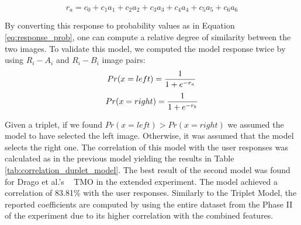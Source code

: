 \begin{equation}
\label{eq:log_regression}
    r_a = c_0 + c_1a_1 + c_2a_2 + c_3a_3 + c_4a_4 + c_5a_5 + c_6a_6 
\end{equation}

By converting this response to probability values as in Equation \ref{eq:response_prob}, one can compute a relative degree of similarity between the two images. To validate this model, we computed the model response twice by using $R_i - A_i$ and $R_i - B_i$ image pairs:
\begin{equation}
    Pr(x = left) = {{1} \over {1 + e^{-r_a}}} 
\end{equation}
\begin{equation}
    Pr(x = right) = {{1} \over {1 + e^{-r_b}}}
\end{equation}


Given a triplet, if we found $Pr(x = left) > Pr(x =right)$ we assumed the model to have selected the left image. Otherwise, it was assumed that the model selects the right one. The correlation of this model with the user responses was calculated as in the previous model yielding the results in Table \ref{tab:correlation_duplet_model}. The best result of the second model was found for Drago et al.’s ~\cite{drago2003adaptive} TMO in the extended experiment. The model achieved a correlation of 83.81\% with the user responses. Similarly to the Triplet Model, the reported coefficients are computed by using the entire dataset from the Phase II of the experiment due to its higher correlation with the combined features.

